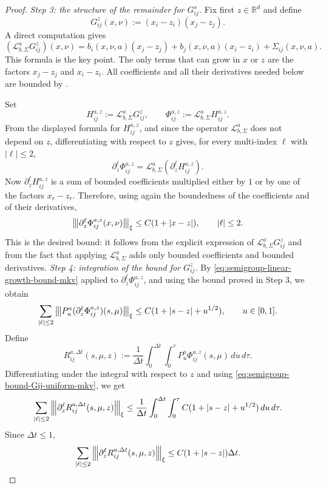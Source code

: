 \documentclass[a4paper, 10pt, english, reqno]{amsart}
\def\R{\mathbb R}
\newcommand{\tnorm}[1]{\left\vert\kern-0.25ex\left\vert\kern-0.25ex\left\vert #1
\right\vert\kern-0.25ex\right\vert\kern-0.25ex\right\vert}
\begin{document}
\begin{proof}
\emph{Step 3: the structure of the remainder for $G_{ij}^s$.}
Fix first $z\in\R^d$ and define
\[
  G_{ij}^z(x,\nu):=(x_i-z_i)(x_j-z_j).
\]
A direct computation gives
\[
(\mathscr L_{b,\Sigma}^aG_{ij}^z)(x,\nu)
=
b_i(x,\nu,a)(x_j-z_j)
+
b_j(x,\nu,a)(x_i-z_i)
+
\Sigma_{ij}(x,\nu,a).
\]
This formula is the key point. The only terms that can grow in $x$ or
$z$ are the factors $x_j-z_j$ and $x_i-z_i$. All coefficients and all
their derivatives needed below are bounded by
.

Set
\[
  H_{ij}^{a,z}:=\mathscr L_{b,\Sigma}^aG_{ij}^z,
  \qquad
  \Phi_{ij}^{a,z}:=\mathscr L_{b,\Sigma}^aH_{ij}^{a,z}.
\]
From the displayed formula for $H_{ij}^{a,z}$, and since the operator
$\mathscr L_{b,\Sigma}^a$ does not depend on $z$, differentiating with
respect to $z$ gives, for every multi-index $\ell$ with $|\ell|\le2$,
\[
  \partial_z^\ell\Phi_{ij}^{a,z}
  =
  \mathscr L_{b,\Sigma}^a(\partial_z^\ell H_{ij}^{a,z}).
\]
Now $\partial_z^\ell H_{ij}^{a,z}$ is a sum of bounded coefficients
multiplied either by $1$ or by one of the factors $x_r-z_r$. Therefore,
using again the boundedness of the coefficients and of their derivatives,
\[
  \tnorm{\partial_z^\ell\Phi_{ij}^{a,z}(x,\nu)}_{\xi}
  \le
  C(1+|x-z|),
  \qquad |\ell|\le2.
\]
This is the desired bound: it follows from the explicit expression of
$\mathscr L_{b,\Sigma}^aG_{ij}^z$ and from the fact that applying
$\mathscr L_{b,\Sigma}^a$ adds only bounded coefficients and bounded
derivatives.
\emph{Step 4: integration of the bound for $G_{ij}^z$.}
By \eqref{eq:semigroup-linear-growth-bound-mkv} applied to $\partial_z^\ell\Phi_{ij}^{a,z}$, and using the bound proved in Step 3, we obtain
\begin{equation}
\label{eq:semigroup-bound-Gij-uniform-mkv}
\sum_{|\ell|\le2}
\tnorm{
P_u^a(\partial_z^\ell\Phi_{ij}^{a,z})(s,\mu)
}_{\xi}
\le
C(1+|s-z|+u^{1/2}),
\qquad u\in[0,1].
\end{equation}
Define
\[
R_{ij}^{a,\Delta t}(s,\mu,z)
:=
\frac1{\Delta t}
\int_0^{\Delta t}\int_0^\tau
P_u^a\Phi_{ij}^{a,z}(s,\mu)\,du\,d\tau .
\]
Differentiating under the integral with respect to $z$ and using \eqref{eq:semigroup-bound-Gij-uniform-mkv}, we get
\[
\sum_{|\ell|\le2}
\tnorm{
\partial_z^\ell R_{ij}^{a,\Delta t}(s,\mu,z)
}_{\xi}
\le
\frac1{\Delta t}
\int_0^{\Delta t}\int_0^\tau
C(1+|s-z|+u^{1/2})\,du\,d\tau .
\]
Since $\Delta t\le1$,
\begin{equation}
\label{eq:RGij-z-bound-uniform-mkv}
\sum_{|\ell|\le2}
\tnorm{
\partial_z^\ell R_{ij}^{a,\Delta t}(s,\mu,z)
}_{\xi}
\le
C(1+|s-z|)\Delta t .
\end{equation}


\end{proof}
\end{document}
